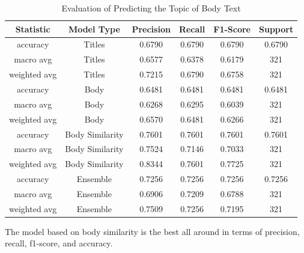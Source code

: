 \documentclass[11pt]{article}
\begin{document}
\begin{table}[h]
\centering
\begin{tabular}{ c | c | c | c | c | c}
  \hline
  Statistic & Model Type & Precision & Recall & F1-Score & Support \\
  \hline  
  accuracy & Titles & 0.6790  & 0.6790 & 0.6790 & 0.6790 \\
  macro avg & Titles & 0.6577 & 0.6378 & 0.6179 &  321 \\
  weighted avg & Titles & 0.7215 & 0.6790 & 0.6758 & 321 \\  
  accuracy & Body & 0.6481  & 0.6481 & 0.6481 & 0.6481 \\
  macro avg & Body & 0.6268 & 0.6295 & 0.6039 &  321 \\
  weighted avg & Body & 0.6570 & 0.6481 & 0.6266 & 321 \\
  accuracy & Body Similarity & 0.7601  & 0.7601 & 0.7601 & 0.7601 \\
  macro avg & Body Similarity & 0.7524 & 0.7146 & 0.7033 &  321 \\
  weighted avg & Body Similarity & 0.8344 & 0.7601 & 0.7725 & 321 \\
  accuracy & Ensemble & 0.7256  & 0.7256 & 0.7256 & 0.7256 \\
  macro avg & Ensemble & 0.6906 & 0.7209 & 0.6788 &  321 \\
  weighted avg & Ensemble & 0.7509 & 0.7256 & 0.7195 & 321 \\
  
  \hline  
\end{tabular}
\caption{Evaluation of Predicting the Topic of Body Text }
\label{tbl:classification report}
\end{table}

The model based on body similarity is the best all around in terms of precision, recall, f1-score, and accuracy.   

\vspace{5 mm}
\end{document}
